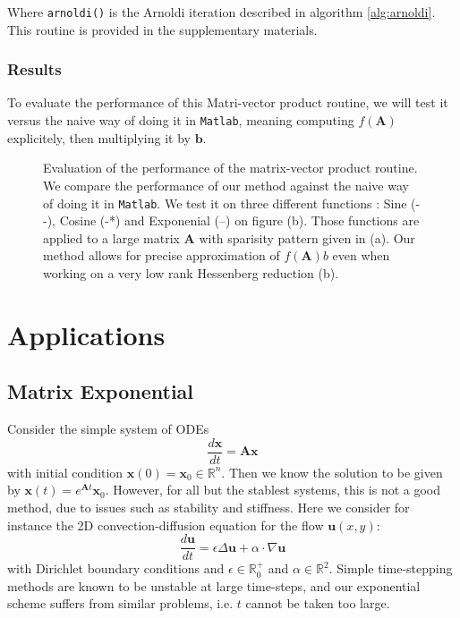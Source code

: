 \documentclass[11pt]{article}
\numberwithin{equation}{section}
\begin{document}
Where \texttt{arnoldi()} is the Arnoldi iteration described in algorithm \ref{alg:arnoldi}. This routine is provided in the supplementary materials.

\subsubsection{Results}
To evaluate the performance of this Matri-vector product routine, we will test it versus the naive way of doing it in \texttt{Matlab}, meaning computing $f(\mathbf{A})$ explicitely, then multiplying it by $\mathbf{b}$.
\begin{figure}
    \begin{subfigure}[b]{.45\linewidth}
        
        \caption{}
        \label{fig:comp_fab_pattern}
    \end{subfigure}
    \begin{subfigure}[b]{.45\linewidth}
        
        \caption{}
        \label{fig:comp_fab_assignement}
    \end{subfigure}
    \caption{Evaluation of the performance of the matrix-vector product routine. We compare the performance of our method against the naive way of doing it in \texttt{Matlab}. We test it on three different functions : Sine (- -), Cosine (-*) and Exponenial (--) on figure (b). Those functions are applied to a large matrix $\mathbf{A}$ with sparisity pattern given in (a). Our method allows for precise approximation of $f(\mathbf{A})b$ even when working on a very low rank Hessenberg reduction (b).}
\end{figure}

\section{Applications}
\subsection{Matrix Exponential}\label{sec:matrixexp}
Consider the simple system of ODEs
\begin{equation}\label{eq:ode}
    \frac{d\mathbf{x}}{dt} = \mathbf{A}\mathbf{x}
\end{equation}
with initial condition $\mathbf{x}(0) = \mathbf{x}_0\in\mathbb{R}^n$. Then we know the solution to be given by $\mathbf{x}(t)=e^{\mathbf{A}t}\mathbf{x}_0$. However, for all but the stablest systems, this is not a good method, due to issues such as stability and stiffness. Here we consider for instance the 2D convection-diffusion equation for the flow $\mathbf{u}(x,y)$:
$$\frac{d \mathbf{u}}{d t}=\epsilon\Delta\mathbf{u}+\alpha\cdot\nabla\mathbf{u}$$
with Dirichlet boundary conditions and $\epsilon\in\mathbb{R}^{+}_0$ and $\alpha\in\mathbb{R}^2$. Simple time-stepping methods are known to be unstable at large time-steps, and our exponential scheme suffers from similar problems, i.e. $t$ cannot be taken too large.
\end{document}
